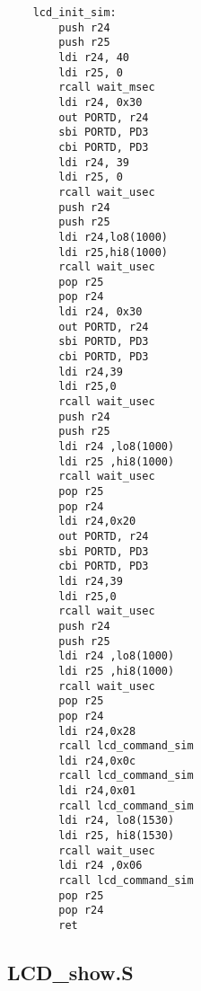 \documentclass[11pt]{article}
\begin{document}
\begin{verbatim}
	lcd_init_sim:
        push r24
        push r25
        ldi r24, 40
        ldi r25, 0
        rcall wait_msec
        ldi r24, 0x30
        out PORTD, r24
        sbi PORTD, PD3
        cbi PORTD, PD3
        ldi r24, 39
        ldi r25, 0
        rcall wait_usec
        push r24
        push r25
        ldi r24,lo8(1000)
        ldi r25,hi8(1000)
        rcall wait_usec
        pop r25
        pop r24
        ldi r24, 0x30
        out PORTD, r24
        sbi PORTD, PD3
        cbi PORTD, PD3
        ldi r24,39
        ldi r25,0
        rcall wait_usec 
        push r24
        push r25
        ldi r24 ,lo8(1000)
        ldi r25 ,hi8(1000)
        rcall wait_usec
        pop r25
        pop r24
        ldi r24,0x20
        out PORTD, r24
        sbi PORTD, PD3
        cbi PORTD, PD3
        ldi r24,39
        ldi r25,0
        rcall wait_usec
        push r24
        push r25
        ldi r24 ,lo8(1000)
        ldi r25 ,hi8(1000)
        rcall wait_usec
        pop r25
        pop r24
        ldi r24,0x28
        rcall lcd_command_sim
        ldi r24,0x0c
        rcall lcd_command_sim
        ldi r24,0x01
        rcall lcd_command_sim
        ldi r24, lo8(1530)
        ldi r25, hi8(1530)
        rcall wait_usec
        ldi r24 ,0x06
        rcall lcd_command_sim
        pop r25
        pop r24
        ret

\end{verbatim}

\subsection*{LCD\_show.S}
\end{document}
